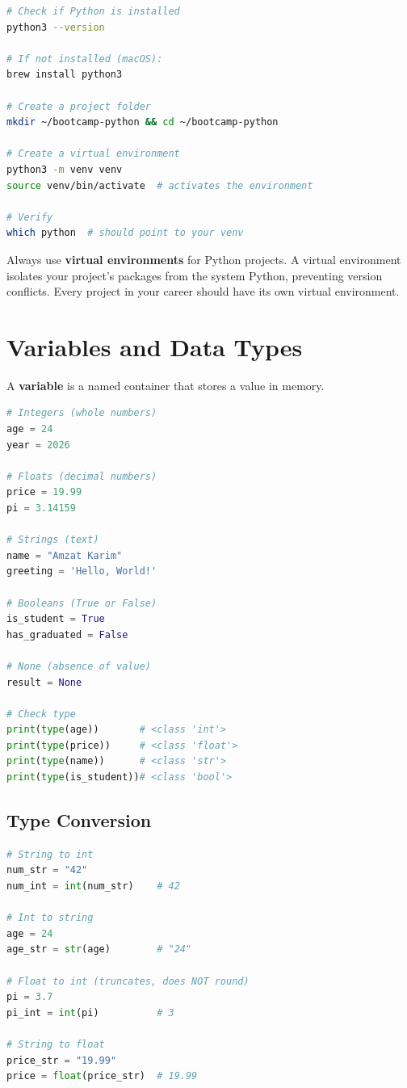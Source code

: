 \documentclass[12pt, a4paper, oneside]{book}
\begin{document}
\begin{lstlisting}[language=bash, caption={Installing and verifying Python}]
# Check if Python is installed
python3 --version

# If not installed (macOS):
brew install python3

# Create a project folder
mkdir ~/bootcamp-python && cd ~/bootcamp-python

# Create a virtual environment
python3 -m venv venv
source venv/bin/activate  # activates the environment

# Verify
which python  # should point to your venv
\end{lstlisting}

\begin{warningbox}
Always use \textbf{virtual environments} for Python projects. A virtual environment isolates your project's packages from the system Python, preventing version conflicts. Every project in your career should have its own virtual environment.
\end{warningbox}

\section{Variables and Data Types}

A \textbf{variable} is a named container that stores a value in memory.

\begin{lstlisting}[language=Python, caption={Variables and basic data types}]
# Integers (whole numbers)
age = 24
year = 2026

# Floats (decimal numbers)
price = 19.99
pi = 3.14159

# Strings (text)
name = "Amzat Karim"
greeting = 'Hello, World!'

# Booleans (True or False)
is_student = True
has_graduated = False

# None (absence of value)
result = None

# Check type
print(type(age))       # <class 'int'>
print(type(price))     # <class 'float'>
print(type(name))      # <class 'str'>
print(type(is_student))# <class 'bool'>
\end{lstlisting}

\subsection{Type Conversion}
\begin{lstlisting}[language=Python, caption={Type conversion}]
# String to int
num_str = "42"
num_int = int(num_str)    # 42

# Int to string
age = 24
age_str = str(age)        # "24"

# Float to int (truncates, does NOT round)
pi = 3.7
pi_int = int(pi)          # 3

# String to float
price_str = "19.99"
price = float(price_str)  # 19.99
\end{lstlisting}
\end{document}
